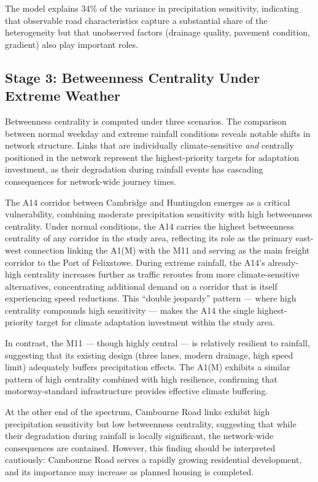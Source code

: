 \documentclass[review]{elsarticle}
\begin{document}
The model explains 34\% of the variance in precipitation sensitivity, indicating that observable road characteristics capture a substantial share of the heterogeneity but that unobserved factors (drainage quality, pavement condition, gradient) also play important roles.

\subsection{Stage 3: Betweenness Centrality Under Extreme Weather}
\label{sec:results:centrality}

Betweenness centrality is computed under three scenarios. The comparison between normal weekday and extreme rainfall conditions reveals notable shifts in network structure. Links that are individually climate-sensitive \textit{and} centrally positioned in the network represent the highest-priority targets for adaptation investment, as their degradation during rainfall events has cascading consequences for network-wide journey times.

The A14 corridor between Cambridge and Huntingdon emerges as a critical vulnerability, combining moderate precipitation sensitivity with high betweenness centrality. Under normal conditions, the A14 carries the highest betweenness centrality of any corridor in the study area, reflecting its role as the primary east-west connection linking the A1(M) with the M11 and serving as the main freight corridor to the Port of Felixstowe. During extreme rainfall, the A14's already-high centrality increases further as traffic reroutes from more climate-sensitive alternatives, concentrating additional demand on a corridor that is itself experiencing speed reductions. This ``double jeopardy'' pattern --- where high centrality compounds high sensitivity --- makes the A14 the single highest-priority target for climate adaptation investment within the study area.

In contrast, the M11 --- though highly central --- is relatively resilient to rainfall, suggesting that its existing design (three lanes, modern drainage, high speed limit) adequately buffers precipitation effects. The A1(M) exhibits a similar pattern of high centrality combined with high resilience, confirming that motorway-standard infrastructure provides effective climate buffering.

At the other end of the spectrum, Cambourne Road links exhibit high precipitation sensitivity but low betweenness centrality, suggesting that while their degradation during rainfall is locally significant, the network-wide consequences are contained. However, this finding should be interpreted cautiously: Cambourne Road serves a rapidly growing residential development, and its importance may increase as planned housing is completed.
\end{document}
